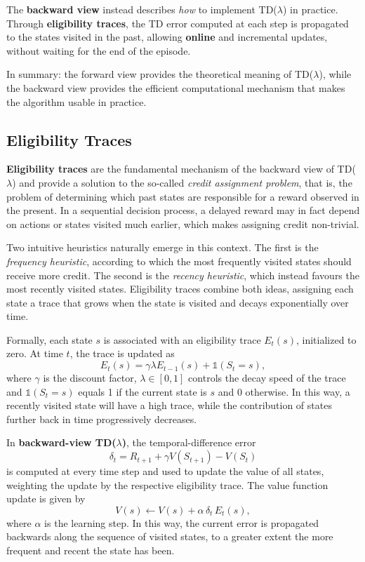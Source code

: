 The \textbf{backward view} instead describes \emph{how} to implement TD($\lambda$) in practice.
Through \textbf{eligibility traces}, the TD error computed at each step is propagated
to the states visited in the past, allowing \textbf{online} and incremental updates, without
waiting for the end of the episode.

In summary: the forward view provides the theoretical meaning of TD($\lambda$), while the backward view
provides the efficient computational mechanism that makes the algorithm usable in practice.

\subsection{Eligibility Traces}

\textbf{Eligibility traces} are the fundamental mechanism of the backward view of
TD($\lambda$) and provide a solution to the so-called \emph{credit assignment problem}, that is, the
problem of determining which past states are responsible for a reward observed in the
present. In a sequential decision process, a delayed reward may in fact depend on
actions or states visited much earlier, which makes assigning credit non-trivial.

Two intuitive heuristics naturally emerge in this context. The first is the
\emph{frequency heuristic}, according to which the most frequently visited states should receive
more credit. The second is the \emph{recency heuristic}, which instead favours the most recently
visited states. Eligibility traces combine both ideas, assigning each state a trace
that grows when the state is visited and decays exponentially over time.

Formally, each state $s$ is associated with an eligibility trace $E_t(s)$, initialized to zero.
At time $t$, the trace is updated as
\[
E_t(s) = \gamma \lambda E_{t-1}(s) + \mathbb{1}(S_t = s),
\]
where $\gamma$ is the discount factor, $\lambda \in [0,1]$ controls the decay speed of the
trace and $\mathbb{1}(S_t = s)$ equals 1 if the current state is $s$ and 0 otherwise. In this way, a
recently visited state will have a high trace, while the contribution of states further back in
time progressively decreases.

In \textbf{backward-view TD($\lambda$)}, the temporal-difference error
\[
\delta_t = R_{t+1} + \gamma V(S_{t+1}) - V(S_t)
\]
is computed at every time step and used to update the value of all states,
weighting the update by the respective eligibility trace. The value function update is
given by
\[
V(s) \leftarrow V(s) + \alpha \, \delta_t \, E_t(s),
\]
where $\alpha$ is the learning step. In this way, the current error is propagated
backwards along the sequence of visited states, to a greater extent the more frequent and recent
the state has been.

